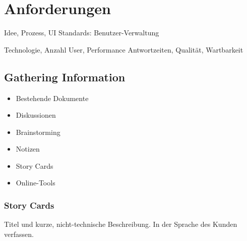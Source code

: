 \section{Anforderungen}

Idee, Prozess, UI
Standards: Benutzer-Verwaltung

Technologie, Anzahl User, Performance
Antwortzeiten, Qualität, Wartbarkeit

\subsection{Gathering Information}
\begin{itemize}
  \item Bestehende Dokumente
  \item Diskussionen
  \item Brainstorming
  \item Notizen
  \item Story Cards
  \item Online-Tools
\end{itemize}

\subsubsection{Story Cards}
Titel und kurze, nicht-technische Beschreibung. In der Sprache des Kunden verfassen.
